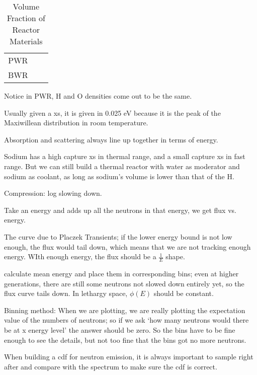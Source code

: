\documentclass{school-22.211-notes}
\begin{document}

\begin{table}
  \centering
  \begin{tabular}{|c|c|c|}
    PWR & & \\
    BWR & & 
  \end{tabular}
  \caption{Volume Fraction of Reactor Materials}
\end{table}
Notice in PWR, H and O densities come out to be the same. 

Usually given a xs, it is given in 0.025 eV because it is the peak of the Maxiwillean distribution in room temperature. 

Absorption and scattering always line up together in terms of energy. 

Sodium has a high capture xs in thermal range, and a small capture xs in fast range. But we can still build a thermal reactor with water as moderator and sodium as coolant, as long as sodium's volume is lower than that of the H. 

Compression: log slowing down. 

Take an energy and adds up all the neutrons in that energy, we get flux vs. energy. 

The curve due to Placzek Transients; if the lower energy bound is not low enough, the flux would tail down, which means that we are not tracking enough energy. WIth enough energy, the flux should be a $\frac{1}{E}$ shape. 

 calculate mean energy and place them in corresponding bins; even at higher generations, there are still some neutrons not slowed down entirely yet, so the flux curve tails down. In lethargy space, $\phi(E)$ should be constant. 

Binning method: When we are plotting, we are really plotting the expectation value of the numbers of neutrons; so if we ask `how many neutrons would there be at x energy level' the answer should be zero. So the bins have to be fine enough to see the details, but not too fine that the bins got no more neutrons. 


When building a cdf for neutron emission, it is always important to sample right after and compare with the spectrum to make sure the cdf is correct. 
\end{document}
